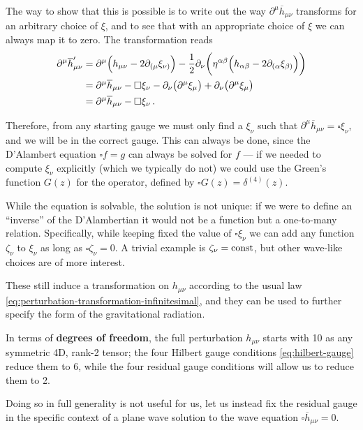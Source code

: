 \documentclass[main.tex]{subfiles}
\begin{document}
The way to show that this is possible is to write out the way \(\partial^{\mu } \overline{h}_{\mu \nu }\) transforms for an arbitrary choice of \(\xi \), and to see that with an appropriate choice of \(\xi \) we can always map it to zero. 
The transformation reads 
%
\begin{align}
\partial^{\mu } \overline{h}_{\mu \nu }' &= 
\partial^{\mu } \qty(h_{\mu \nu } - 2 \partial_{(\mu } \xi_{\nu )}) - \frac{1}{2} \partial_{\nu } \qty(\eta^{\alpha \beta } \qty(h_{\alpha \beta } - 2 \partial_{(\alpha } \xi_{\beta )}))  \\
&= \partial^{\mu } \overline{h}_{\mu \nu } - \square \xi_{\nu } - \partial_{\nu } \qty(\partial^{\mu } \xi_{\mu }) + \partial_{\nu } \qty(\partial^{\mu } \xi_{\mu })  \\
&= \partial^{\mu } \overline{h}_{\mu \nu } - \square \xi_{\nu }
\,. 
\end{align}

Therefore, from any starting gauge we must only find a \(\xi_{\nu }\) such that \(\partial^{\mu } \overline{h}_{\mu \nu } = \square \xi_{\nu }\), and we will be in the correct gauge. 
This can always be done, since the D'Alambert equation \(\square f = g\) can always be solved for \(f\) --- if we needed to compute \(\xi_{\nu }\) explicitly (which we typically do not) we could use the Green's function \(G(z)\) for the operator, defined by \(\square G(z) = \delta^{(4)} (z)\). 

While the equation is solvable, the solution is not unique: if we were to define an ``inverse'' of the D'Alambertian it would not be a function but a one-to-many relation. 
Specifically, while keeping fixed the value of \(\square \xi_{\nu }\) we can add any function \(\zeta_\nu \) to \(\xi _\nu  \) as long as \(\square \zeta _\nu = 0 \). 
A trivial example is \(\zeta _\nu = \text{const}\), but other wave-like choices are of more interest. 

These still induce a transformation on \(h_{\mu \nu }\) according to the usual law \eqref{eq:perturbation-transformation-infinitesimal}, and they can be used to further specify the form of the gravitational radiation. 

In terms of \textbf{degrees of freedom}, the full perturbation \(h_{\mu \nu }\) starts with 10 as any symmetric 4D, rank-2 tensor; the four Hilbert gauge conditions \eqref{eq:hilbert-gauge} reduce them to 6, while the four residual gauge conditions will allow us to reduce them to 2. 

Doing so in full generality is not useful for us, let us instead fix the residual gauge in the specific context of a plane wave solution to the wave equation \(\square \overline{h}_{\mu \nu } = 0\).
\end{document}
